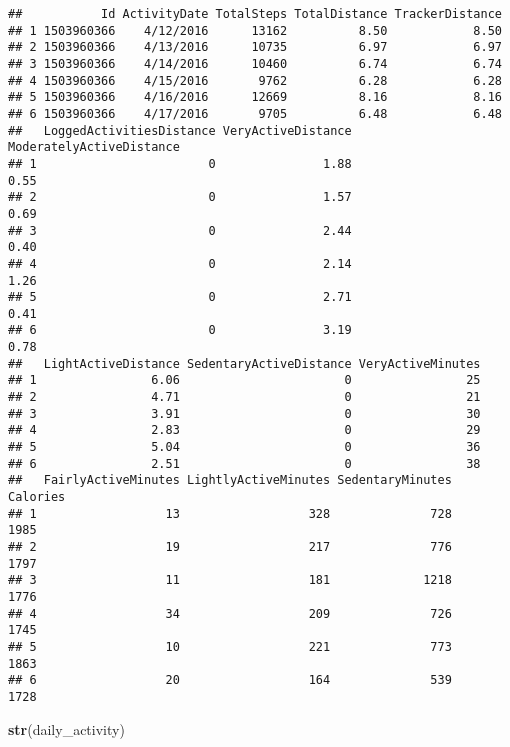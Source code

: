 \documentclass[
]{article}
\newenvironment{Shaded}{\begin{snugshade}}{\end{snugshade}}
\newcommand{\FunctionTok}[1]{\textcolor[rgb]{0.13,0.29,0.53}{\textbf{#1}}}
\newcommand{\NormalTok}[1]{#1}
\begin{document}
\begin{verbatim}
##           Id ActivityDate TotalSteps TotalDistance TrackerDistance
## 1 1503960366    4/12/2016      13162          8.50            8.50
## 2 1503960366    4/13/2016      10735          6.97            6.97
## 3 1503960366    4/14/2016      10460          6.74            6.74
## 4 1503960366    4/15/2016       9762          6.28            6.28
## 5 1503960366    4/16/2016      12669          8.16            8.16
## 6 1503960366    4/17/2016       9705          6.48            6.48
##   LoggedActivitiesDistance VeryActiveDistance ModeratelyActiveDistance
## 1                        0               1.88                     0.55
## 2                        0               1.57                     0.69
## 3                        0               2.44                     0.40
## 4                        0               2.14                     1.26
## 5                        0               2.71                     0.41
## 6                        0               3.19                     0.78
##   LightActiveDistance SedentaryActiveDistance VeryActiveMinutes
## 1                6.06                       0                25
## 2                4.71                       0                21
## 3                3.91                       0                30
## 4                2.83                       0                29
## 5                5.04                       0                36
## 6                2.51                       0                38
##   FairlyActiveMinutes LightlyActiveMinutes SedentaryMinutes Calories
## 1                  13                  328              728     1985
## 2                  19                  217              776     1797
## 3                  11                  181             1218     1776
## 4                  34                  209              726     1745
## 5                  10                  221              773     1863
## 6                  20                  164              539     1728
\end{verbatim}

\begin{Shaded}
\begin{Highlighting}[]
\FunctionTok{str}\NormalTok{(daily\_activity)}
\end{Highlighting}
\end{Shaded}
\end{document}

